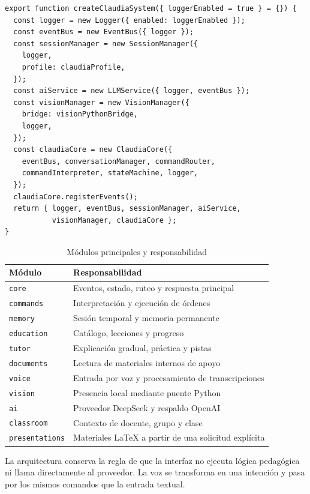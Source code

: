 \documentclass[11pt]{article}
\begin{document}
\begin{lstlisting}
export function createClaudiaSystem({ loggerEnabled = true } = {}) {
  const logger = new Logger({ enabled: loggerEnabled });
  const eventBus = new EventBus({ logger });
  const sessionManager = new SessionManager({
    logger,
    profile: claudiaProfile,
  });
  const aiService = new LLMService({ logger, eventBus });
  const visionManager = new VisionManager({
    bridge: visionPythonBridge,
    logger,
  });
  const claudiaCore = new ClaudiaCore({
    eventBus, conversationManager, commandRouter,
    commandInterpreter, stateMachine, logger,
  });
  claudiaCore.registerEvents();
  return { logger, eventBus, sessionManager, aiService,
           visionManager, claudiaCore };
}
\end{lstlisting}

\begin{table}[H]
\centering
\caption{Módulos principales y responsabilidad}
\begin{tabularx}{\textwidth}{@{}>{\raggedright\arraybackslash}p{1.35in}>{\raggedright\arraybackslash}X@{}}
\toprule
\textbf{Módulo} & \textbf{Responsabilidad} \\
\midrule
\texttt{core} & Eventos, estado, ruteo y respuesta principal \\
\texttt{commands} & Interpretación y ejecución de órdenes \\
\texttt{memory} & Sesión temporal y memoria permanente \\
\texttt{education} & Catálogo, lecciones y progreso \\
\texttt{tutor} & Explicación gradual, práctica y pistas \\
\texttt{documents} & Lectura de materiales internos de apoyo \\
\texttt{voice} & Entrada por voz y procesamiento de transcripciones \\
\texttt{vision} & Presencia local mediante puente Python \\
\texttt{ai} & Proveedor DeepSeek y respaldo OpenAI \\
\texttt{classroom} & Contexto de docente, grupo y clase \\
\texttt{presentations} & Materiales LaTeX a partir de una solicitud explícita \\
\bottomrule
\end{tabularx}
\end{table}

La arquitectura conserva la regla de que la interfaz no ejecuta lógica pedagógica ni llama directamente al proveedor. La voz se transforma en una intención y pasa por los mismos comandos que la entrada textual.
\end{document}
